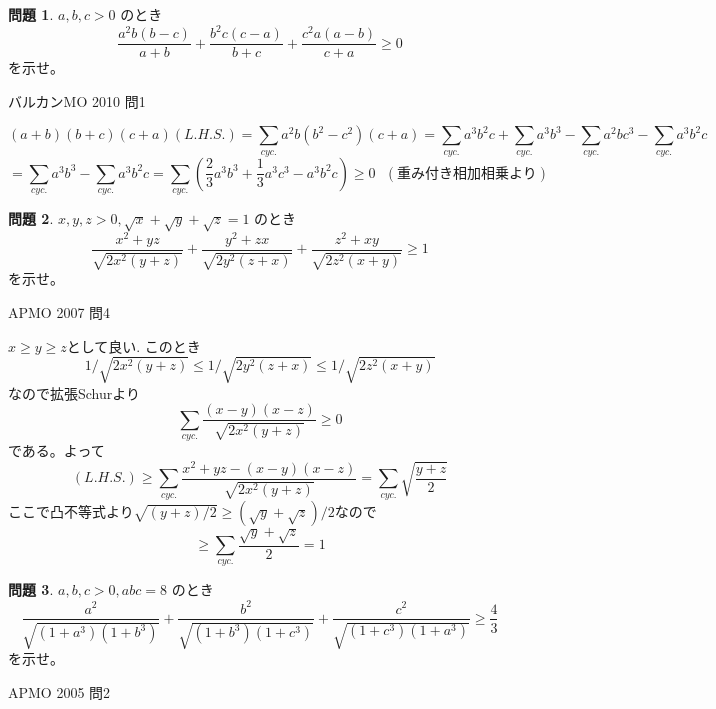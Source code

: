 \documentclass[uplatex, a5paper]{jsarticle}
\makeatletter
\theoremstyle{definition}
\newtheorem{prob}{問題}
\renewenvironment{proof}[1][\proofname]{
  \pushQED{\qed}%
  \normalfont \topsep6\p@\@plus6\p@\relax
  \trivlist
  \item[\hskip\labelsep
    #1\@addpunct{\textbf{.}}]\ignorespaces
}{%
  \popQED\endtrivlist\@endpefalse
}
\providecommand{\proofname}{証明}
\newcommand{\lhs }{ L.H.S. }
\def\qed{\hfill $\Box$}
\makeatother
\begin{document}
\newpage

\begin{prob}
  \(a,b,c>0\)
  のとき
  \[
  \frac{a^2b(b-c)}{a+b} + \frac{b^2c(c-a)}{b+c} + \frac{c^2a(a-b)}{c+a} \geq 0
  \]
  を示せ。
  \begin{flushright}
    バルカンMO 2010 問1
  \end{flushright}
\end{prob}


\begin{proof}
  \[
  (a+b)(b+c)(c+a)(L.H.S.)
  = \sum_{cyc.} a^2b(b^2-c^2)(c+a)
  = \sum_{cyc.}a^3b^2c + \sum_{cyc.}a^3b^3 -\sum_{cyc.} a^2bc^3 - \sum_{cyc.} a^3b^2c
  \]
  \[
  = \sum_{cyc.}a^3b^3 - \sum_{cyc.} a^3b^2c
  = \sum_{cyc.} \left( \frac{2}{3}a^3b^3 + \frac{1}{3}a^3c^3 -a^3b^2c \right)
  \geq 0 \ \ \ \left( \mbox{重み付き相加相乗より} \right)
  \]
\end{proof}









\newpage

\begin{prob}
  \(x,y,z>0, \sqrt{x} + \sqrt{y} + \sqrt{z} = 1\)
  のとき
  \[
  \frac{x^2+yz}{\sqrt{2x^2(y+z)}} + \frac{y^2+zx}{\sqrt{2y^2(z+x)}} + \frac{z^2+xy}{\sqrt{2z^2(x+y)}} \geq 1
  \]
  を示せ。
  \begin{flushright}
    APMO 2007 問4
  \end{flushright}
\end{prob}



\begin{proof}
  \(x \geq y \geq z\)として良い.
  このとき
  \[1/\sqrt{2x^2(y+z)} \leq 1/\sqrt{2y^2(z+x)} \leq 1/\sqrt{2z^2(x+y)}\]なので拡張Schurより
  \[
  \sum_{cyc.}\frac{(x-y)(x-z)}{\sqrt{2x^2(y+z)}} \geq 0
  \]
  である。よって
  \[
  (\lhs ) \geq \sum_{cyc.} \frac{x^2+yz - (x-y)(x-z)}{\sqrt{2x^2(y+z)}} = \sum_{cyc.} \sqrt{\frac{y+z}{2}}
  \]
  ここで凸不等式より\(\sqrt{(y+z)/2} \geq (\sqrt{y} + \sqrt{z})/2\)なので
  \[
  \geq  \sum_{cyc.} \frac{\sqrt{y}+\sqrt{z}}{2} = 1
  \]
\end{proof}











\newpage

\begin{prob}
  \(a,b,c>0, abc=8\)
  のとき
  \[
  \frac{a^2}{\sqrt{(1+a^3)(1+b^3)}} + \frac{b^2}{\sqrt{(1+b^3)(1+c^3)}} + \frac{c^2}{\sqrt{(1+c^3)(1+a^3)}}
  \geq \frac{4}{3}
  \]
  を示せ。
  \begin{flushright}
    APMO 2005 問2
  \end{flushright}
\end{prob}
\end{document}
